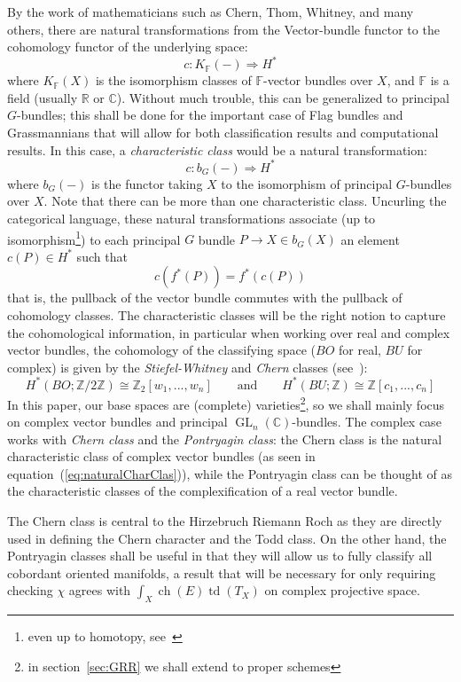 \documentclass{book}
\newcommand{\F}{{\mathbb{F}}}
\newcommand{\R}{{\mathbb{R}}}
\newcommand{\Z}{{\mathbb{Z}}}
\newcommand{\C}{{\mathbb{C}}}
\newcommand{\ch}{{\operatorname{ch}}}
\newcommand{\GL}{{\operatorname{GL}}}
\newcommand{\Rw}{\Rightarrow}
\newcommand{\td}{{\operatorname{td}}}
\renewcommand{\ch}{{\operatorname{ch}}}
\begin{document}
By the work of mathematicians such as Chern, Thom, Whitney, and many others, there are natural transformations
from the Vector-bundle functor to the cohomology functor of the underlying space:
\[
  c: K_\F(-) \Rw H^*
\]
where $K_\F(X)$ is the isomorphism classes of $\F$-vector bundles over $X$, and $\F$ is a field (usually $\R$
or $\C$). Without much trouble, this can be generalized to principal $G$-bundles; this shall be done for the
important case of Flag bundles and Grassmannians that will allow for both classification results and
computational results. In this case, a \emph{characteristic class} would be a natural transformation:
\[
  c: b_G(-) \Rw H^*
\]
where $b_G(-)$ is the functor taking $X$ to the isomorphism of principal $G$-bundles over $X$. Note that there
can be more than one characteristic class. Uncurling the categorical language, these natural
transformations associate (up to isomorphism\footnote{even up to homotopy, see~\cite{NateKTheory}}) to each principal $G$ bundle $P \to X\in b_G(X)$ an element $c(P) \in H^*$ such
that
\[
  c(f^*(P)) = f^*(c(P))
\]
that is, the pullback of the vector bundle commutes with the pullback of
cohomology classes. The characteristic classes will be the right notion to capture the cohomological
information, in particular when working over real and complex vector bundles, the cohomology
of the classifying space ($BO$ for real, $BU$ for complex) is given by the \emph{Stiefel-Whitney} and \emph{Chern} classes
(see~\cite{NateKTheory}):
\begin{equation}\label{eq:naturalCharClas}
  H^*(BO; \Z/2\Z) \cong \Z_2[w_1, ..., w_n] \qquad \text{and} \qquad  H^*(BU; \Z)
  \cong \Z[c_1, ..., c_n]
\end{equation}
In this paper, our base spaces are (complete) varieties\footnote{in section~\ref{sec:GRR} we shall extend to
proper schemes}, so we shall mainly focus on complex vector bundles and principal
$\GL_n(\C)$-bundles. The complex case works with \emph{Chern class} and the \emph{Pontryagin class}: the Chern class
is the natural characteristic class of complex vector bundles (as seen in
equation~(\ref{eq:naturalCharClas})), while the Pontryagin class can be thought of as the characteristic
classes of the complexification of a real vector bundle.

The Chern class is central to the Hirzebruch Riemann Roch as they are directly used in defining the Chern
character and the Todd class. On the other hand, the Pontryagin classes shall be useful in that they will
allow us to fully classify all cobordant oriented manifolds, a result that will be necessary for only requiring checking
$\chi$ agrees with $\int_X \ch(E)\td(T_X)$ on complex projective space.
\end{document}
